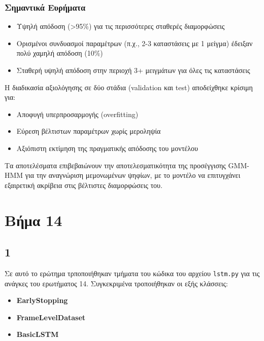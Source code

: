 \documentclass[a4paper,12pt]{article}
\begin{document}
\subsubsection*{Σημαντικά Ευρήματα}
\begin{itemize}
    \item Υψηλή απόδοση (>95\%) για τις περισσότερες σταθερές διαμορφώσεις
    \item Ορισμένοι συνδυασμοί παραμέτρων (π.χ., 2-3 καταστάσεις με 1 μείγμα) έδειξαν πολύ χαμηλή απόδοση (10\%)
    \item Σταθερή υψηλή απόδοση στην περιοχή 3+ μειγμάτων για όλες τις καταστάσεις
\end{itemize}

Η διαδικασία αξιολόγησης σε δύο στάδια (validation και test) αποδείχθηκε κρίσιμη για:
\begin{itemize}
    \item Αποφυγή υπερπροσαρμογής (overfitting)
    \item Εύρεση βέλτιστων παραμέτρων χωρίς μεροληψία
    \item Αξιόπιστη εκτίμηση της πραγματικής απόδοσης του μοντέλου
\end{itemize}

Τα αποτελέσματα επιβεβαιώνουν την αποτελεσματικότητα της προσέγγισης GMM-HMM για την αναγνώριση μεμονωμένων ψηφίων,
με το μοντέλο να επιτυγχάνει εξαιρετική ακρίβεια στις βέλτιστες διαμορφώσεις του.

\section*{Βήμα 14}
\subsection*{1}

Σε αυτό το ερώτημα τρποποιήθηκαν τμήματα του κώδικα του αρχείου \texttt{lstm.py}
για τις ανάγκες του ερωτήματος 14. Συγκεκριμένα τροποιήθηκαν οι εξής κλάσσεις:

\begin{itemize}
    \item \textbf{EarlyStopping}
    \item \textbf{FrameLevelDataset}
    \item \textbf{BasicLSTM}
\end{itemize}
\end{document}

